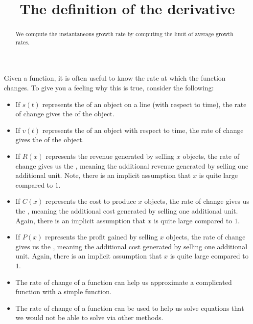 \documentclass{ximera}
\title[Dig-In:]{The definition of the derivative}
\begin{document}
\begin{abstract}
We compute the instantaneous growth rate by computing the limit of
average growth rates.
\end{abstract}
\maketitle


Given a function, it is often useful to know the rate at which the
function changes. To give you a feeling why this is true, consider the
following:
\begin{itemize}
\item If $s(t)$ represents the  of an object on a line (with respect to time), the rate of change gives
  the  of the object.
\item If $v(t)$ represents the  of an object with respect to
  time, the rate of change gives the  of the object.
\item If $R(x)$ represents the revenue generated by selling $x$
  objects, the rate of change gives us the ,
  meaning the additional revenue generated by selling one additional
  unit. Note, there is an implicit assumption that $x$ is quite large
  compared to $1$.
\item If $C(x)$ represents the cost to produce $x$ objects, the rate
  of change gives us the , meaning the
  additional cost generated by selling one additional unit. Again,
  there is an implicit assumption that $x$ is quite large compared to
  $1$.
\item If $P(x)$ represents the profit gained by selling $x$ objects,
  the rate of change gives us the , meaning
  the additional cost generated by selling one additional unit. Again,
  there is an implicit assumption that $x$ is quite large compared to
  $1$.
\item The rate of change of a function can help us approximate a
  complicated function with a simple function.
\item The rate of change of a function can be used to help us solve
  equations that we would not be able to solve via other methods.
\end{itemize}

\end{document}
